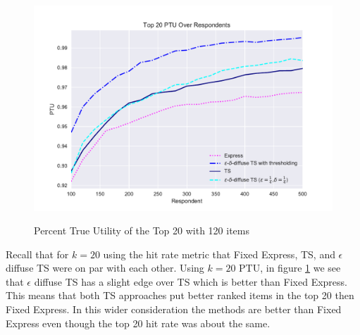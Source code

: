 \documentclass[nonblindrev]{informs3}
\begin{document}
\begin{figure}
\caption{Percent True Utility of the Top 20 with 120 items}
\includegraphics[width=1\textwidth]{plots/PTU120v20k20.pdf}
\label{fig:20util}
\end{figure}
Recall that for $k=20$ using the hit rate metric that Fixed Express, TS, and $\epsilon$ diffuse TS were on par with each other.
Using $k=20$ PTU, in figure \ref{fig:20util} we see that $\epsilon$ diffuse TS has a slight edge over TS which is better than Fixed Express. This means that both TS approaches put better ranked items in the top 20 then Fixed Express. In this wider consideration the methods are better than Fixed Express even though the top 20 hit rate was about the same.
\end{document}
